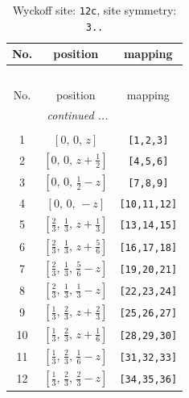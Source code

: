 \documentclass[fleqn,8pt]{jsarticle}
\begin{document}
\begin{longtable}{ccc}
\caption{Wyckoff site: {\tt 12c}, site symmetry: {\tt 3..}}
 \\
 \hline \hline
No. & position & mapping \\ \hline \endfirsthead

\multicolumn{2}{l}{\tablename\ \thetable{}} \\
 \hline \hline
No. & position & mapping \\ \hline \endhead

 \hline \hline
\multicolumn{2}{r}{\footnotesize\it continued ...} \\ \endfoot

 \hline \hline
\multicolumn{2}{r}{} \\ \endlastfoot

1 & $\left[ 0,\, 0,\, z \right]$ & {\tt [1,2,3]} \\ \hline
2 & $\left[ 0,\, 0,\, z + \frac{1}{2} \right]$ & {\tt [4,5,6]} \\ \hline
3 & $\left[ 0,\, 0,\, \frac{1}{2} - z \right]$ & {\tt [7,8,9]} \\ \hline
4 & $\left[ 0,\, 0,\, - z \right]$ & {\tt [10,11,12]} \\ \hline
5 & $\left[ \frac{2}{3},\, \frac{1}{3},\, z + \frac{1}{3} \right]$ & {\tt [13,14,15]} \\ \hline
6 & $\left[ \frac{2}{3},\, \frac{1}{3},\, z + \frac{5}{6} \right]$ & {\tt [16,17,18]} \\ \hline
7 & $\left[ \frac{2}{3},\, \frac{1}{3},\, \frac{5}{6} - z \right]$ & {\tt [19,20,21]} \\ \hline
8 & $\left[ \frac{2}{3},\, \frac{1}{3},\, \frac{1}{3} - z \right]$ & {\tt [22,23,24]} \\ \hline
9 & $\left[ \frac{1}{3},\, \frac{2}{3},\, z + \frac{2}{3} \right]$ & {\tt [25,26,27]} \\ \hline
10 & $\left[ \frac{1}{3},\, \frac{2}{3},\, z + \frac{1}{6} \right]$ & {\tt [28,29,30]} \\ \hline
11 & $\left[ \frac{1}{3},\, \frac{2}{3},\, \frac{1}{6} - z \right]$ & {\tt [31,32,33]} \\ \hline
12 & $\left[ \frac{1}{3},\, \frac{2}{3},\, \frac{2}{3} - z \right]$ & {\tt [34,35,36]} \\
\end{longtable}
\renewcommand{\arraystretch}{1.2}
\end{document}
